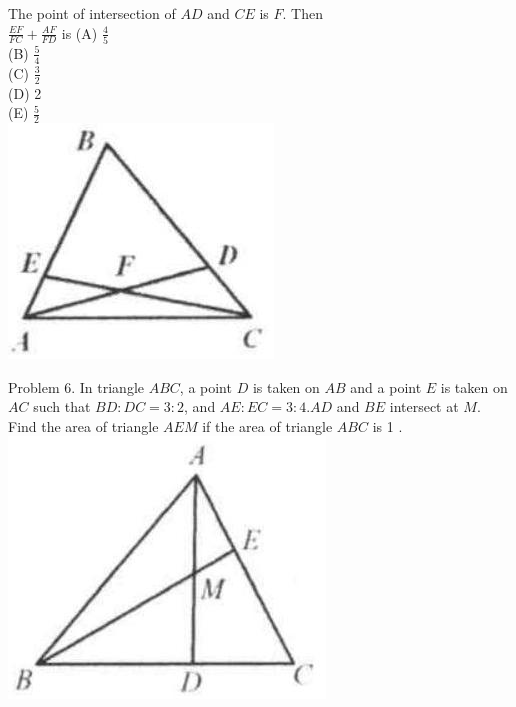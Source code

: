 \documentclass[10pt]{article}
\begin{document}
The point of intersection of \(A D\) and \(C E\) is \(F\). Then\\
\(\frac{E F}{F C}+\frac{A F}{F D}\) is (A) \(\frac{4}{5}\)\\
(B) \(\frac{5}{4}\)\\
(C) \(\frac{3}{2}\)\\
(D) 2\\
(E) \(\frac{5}{2}\)\\
\includegraphics[max width=\textwidth, center]{2025_04_17_97bc1f7e44d93c271a88g-127}

Problem 6. In triangle \(A B C\), a point \(D\) is taken on \(A B\) and a point \(E\) is taken on \(A C\) such that \(B D: D C=3: 2\), and \(A E: E C=3: 4 . A D\) and \(B E\) intersect at \(M\). Find the area of triangle \(A E M\) if the area of triangle \(A B C\) is 1 .\\
\includegraphics[max width=\textwidth, center]{2025_04_17_97bc1f7e44d93c271a88g-127(3)}
\end{document}
